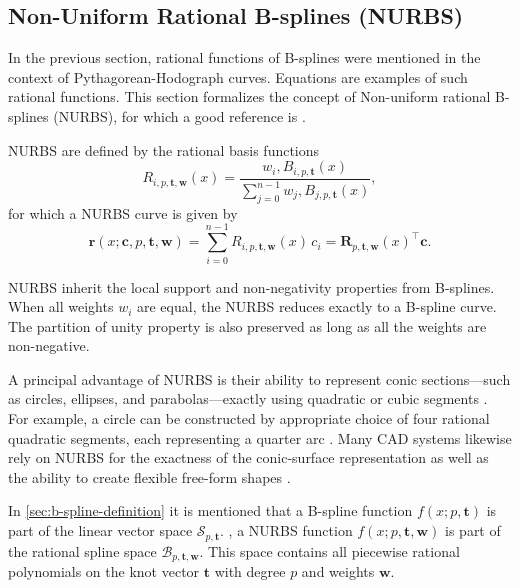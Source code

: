 \subsection{Non-Uniform Rational B-splines (NURBS)}
In the previous section, rational functions of B-splines were mentioned in the context of Pythagorean-Hodograph curves. Equations  are examples of such rational functions. This section formalizes the concept of Non-uniform rational B-splines (NURBS), for which a good reference is \cite{Piegl1997}. 

NURBS are defined by the rational basis functions
\begin{equation}\label{eq:nurbs-basis}
R_{i,p,\mathbf t, \mathbf w}(x)  = \frac{w_i,B_{i,p,\mathbf t}(x)}{\sum_{j=0}^{n-1}w_j,B_{j,p,\mathbf t}(x)},
\end{equation}
for which a NURBS curve is given by
\begin{equation}\label{eq:nurbs-curve}
\mathbf r(x; \mathbf c, p, \mathbf t, \mathbf w)  = \sum_{i=0}^{n-1}R_{i,p,\mathbf t, \mathbf w}(x)\,c_i
= \mathbf R_{p,\mathbf t, \mathbf w}(x)^\top \mathbf c.
\end{equation}

NURBS inherit the local support and non-negativity properties from B-splines. When all weights $w_i$ are equal, the NURBS reduces exactly to a B-spline curve. The partition of unity property is also preserved as long as all the weights are non-negative. \citep{Piegl1997}

A principal advantage of NURBS is their ability to represent conic sections---such as circles, ellipses, and parabolas---exactly using quadratic or cubic segments \citep{Piegl1997}. For example, a circle can be constructed by appropriate choice of four rational quadratic segments, each representing a quarter arc \citep{DenbighStarkeyNURBS}. Many CAD systems likewise rely on NURBS for the exactness of the conic-surface representation as well as the ability to create flexible free-form shapes \citep{Farin1991,PieglTillerSIGGRAPH,cottrell2009isogeometric}.

In \cref{sec:b-spline-definition} it is mentioned that a B-spline function $f(x; p, \mathbf t)$ is part of the linear vector space $\mathcal S_{p, \mathbf t}$.
, a NURBS function $f(x; p, \mathbf t, \mathbf w)$ is part of the rational spline space $\mathcal B_{p, \mathbf t, \mathbf w}$. This space contains all piecewise rational polynomials on the knot vector $\mathbf t$ with degree $p$ and weights $\mathbf w$. 



